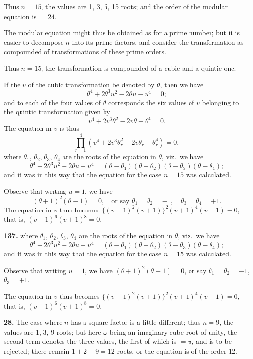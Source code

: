 \documentclass[11pt,a4paper]{book}
\begin{document}
Thus $n = 15$, the values are 1, 3, 5, 15 roots; and the order of the modular equation is $= 24$.

The modular equation might thus be obtained as for a prime number; but it is easier to decompose $n$ into its prime factors, and consider the transformation as compounded of transformations of these prime orders.

Thus $n = 15$, the transformation is compounded of a cubic and a quintic one.

If the $v$ of the cubic transformation be denoted by $\theta$, then we have
\[
\theta^4 + 2\theta^3u^2 - 2\theta u - u^4 = 0;
\]
and to each of the four values of $\theta$ corresponds the six values of $v$ belonging to the quintic transformation given by
\[
v^4 + 2v^3\theta^2 - 2v\theta - \theta^4 = 0.
\]
The equation in $v$ is thus
\[
\prod_{r=1}^{4}(v^4 + 2v^3\theta_r^2 - 2v\theta_r - \theta_r^4) = 0,
\]
where $\theta_1$, $\theta_2$, $\theta_3$, $\theta_4$ are the roots of the equation in $\theta$, viz.\ we have
\[
\theta^4 + 2\theta^3u^2 - 2\theta u - u^4 = (\theta - \theta_1)(\theta - \theta_2)(\theta - \theta_3)(\theta - \theta_4);
\]
and it was in this way that the equation for the case $n = 15$ was calculated.

Observe that writing $u = 1$, we have
\[
(\theta + 1)^2(\theta - 1) = 0, \quad \text{or say } \theta_1 = \theta_2 = -1, \quad \theta_3 = \theta_4 = +1.
\]
The equation in $v$ thus becomes $\{(v - 1)^2(v + 1)\}^2(v + 1)^4(v - 1) = 0$, that is, $(v - 1)^6(v + 1)^8 = 0$.


\noindent\textbf{137.} where $\theta_1$, $\theta_2$, $\theta_3$, $\theta_4$ are the roots of the equation in $\theta$, viz.\ we have
\[
\theta^4 + 2\theta^3u^2 - 2\theta u - u^4 = (\theta - \theta_1)(\theta - \theta_2)(\theta - \theta_3)(\theta - \theta_4);
\]
and it was in this way that the equation for the case $n = 15$ was calculated.

Observe that writing $u = 1$, we have $(\theta + 1)^2(\theta - 1) = 0$, or say $\theta_1 = \theta_2 = -1$, $\theta_3 = +1$.

The equation in $v$ thus becomes $\{(v - 1)^2(v + 1)\}^2(v + 1)^4(v - 1) = 0$, that is, $(v - 1)^6(v + 1)^8 = 0$.

\medskip
\noindent\textbf{28.} The case where $n$ has a square factor is a little different; thus $n = 9$, the values are 1, 3, 9 roots; but here $\omega$ being an imaginary cube root of unity, the second term denotes the three values, the first of which is $= u$, and is to be rejected; there remain $1 + 2 + 9 = 12$ roots, or the equation is of the order 12.
\end{document}
